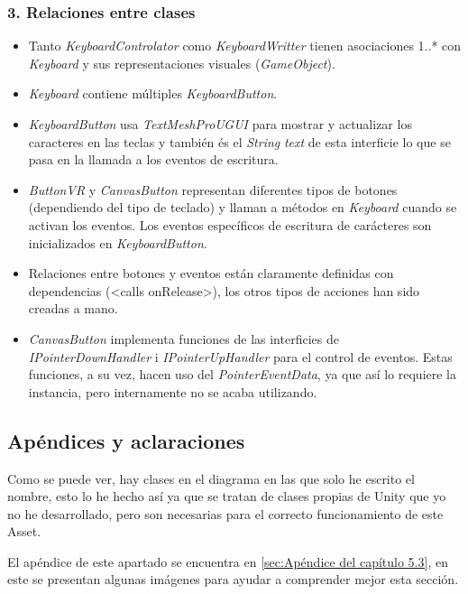 \subsubsection{3. Relaciones entre clases}

\begin{itemize}
	\item Tanto \textit{KeyboardControlator} como \textit{KeyboardWritter} tienen asociaciones 1..* con \textit{Keyboard} y sus representaciones visuales (\textit{GameObject}).
	\item \textit{Keyboard} contiene múltiples \textit{KeyboardButton}.
	\item \textit{KeyboardButton} usa \textit{TextMeshProUGUI} para mostrar y actualizar los caracteres en las teclas y también és el \textit{String} \textit{text} de esta interficie lo que se pasa en la llamada a los eventos de escritura.
	\item \textit{ButtonVR} y \textit{CanvasButton} representan diferentes tipos de botones (dependiendo del tipo de teclado) y llaman a métodos en \textit{Keyboard} cuando se activan los eventos. Los eventos específicos de escritura de carácteres son inicializados en \textit{KeyboardButton}.
	\item Relaciones entre botones y eventos están claramente definidas con dependencias (<calls onRelease>), los otros tipos de acciones han sido creadas a mano.
	\item \textit{CanvasButton} implementa funciones de las interficies de \textit{IPointerDownHandler} i \textit{IPointerUpHandler} para el control de eventos. Estas funciones, a su vez, hacen uso del \textit{PointerEventData}, ya que así lo requiere la instancia, pero internamente no se acaba utilizando.
	
\end{itemize}

\subsection{Apéndices y aclaraciones}

Como se puede ver, hay clases en el diagrama en las que solo he escrito el nombre, esto lo he hecho así ya que se tratan de clases propias de Unity  que yo no he desarrollado, pero son necesarias para el correcto funcionamiento de este Asset.

El apéndice de este apartado se encuentra en \ref{sec:Apéndice del capítulo 5.3}, en este se presentan algunas imágenes para ayudar a comprender mejor esta sección.


